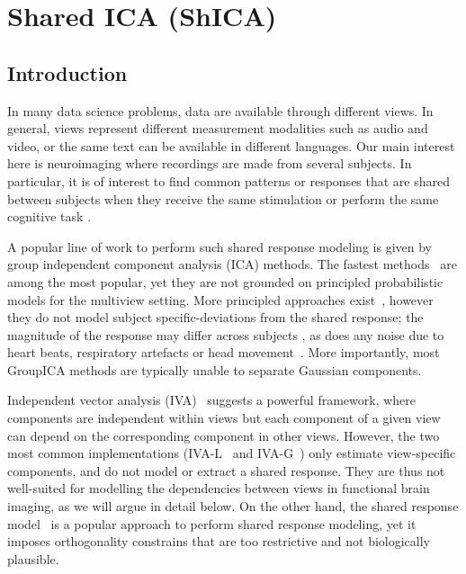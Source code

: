 \chapter{Shared ICA (ShICA)}
\section{Introduction}
In many data science problems, data are available through different views. In general, views represent different measurement modalities such as audio and video, or the same text can be available in different languages. Our main interest here is neuroimaging where recordings are made from several subjects. In particular, it is of interest to find common patterns or responses that are shared between subjects when they receive the same stimulation or perform the same cognitive task \citep{chen2015reduced,richard2020modeling}. 

A popular line of work to perform such shared response modeling is given by group independent component analysis (ICA) methods. The fastest methods~\cite{calhoun2001method, varoquaux2009canica} are among the most popular, yet they are not grounded on principled probabilistic models for the multiview setting. 
%
More principled approaches exist~\cite{richard2020modeling, guo2008unified}, however they do not model subject specific-deviations from the shared response; the magnitude of the response may differ across subjects \cite{penny2007random}, as does any noise due to heart beats, respiratory artefacts or head movement~\cite{liu2016noise}.
%
More importantly, most GroupICA methods are typically unable to separate Gaussian components.

Independent vector analysis (IVA)~\cite{lee2008independent, anderson2011joint} suggests a powerful framework, where components are independent within views but each component of a given view can depend on the corresponding component in other views. 
%
However, the two most common implementations (IVA-L~\cite{lee2008independent} and IVA-G~\cite{anderson2011joint}) only estimate view-specific components, and do not model or extract a shared response. 
%
They are thus not well-suited for modelling the dependencies between views in functional brain imaging, as we will argue in detail below. On the other hand, the shared response model~\cite{chen2015reduced} is a popular approach to perform shared response modeling, yet it imposes orthogonality constrains that are too restrictive and not biologically plausible.

